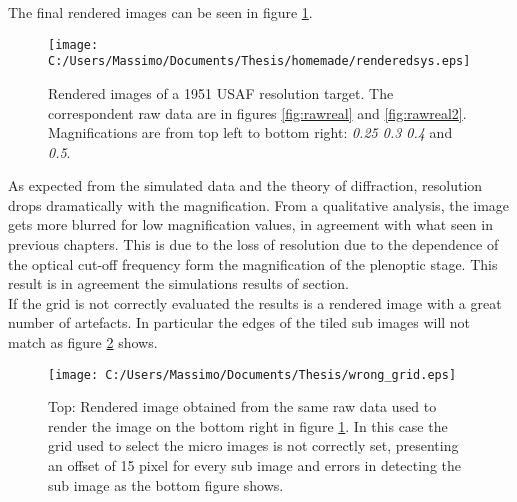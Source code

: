 The final rendered images can be seen in figure \ref{fig:renderingreal1}.
\\
\begin{figure}[H]
	\centering
	\texttt{[image: C:/Users/Massimo/Documents/Thesis/homemade/renderedsys.eps]}
	\caption{\label{fig:renderingreal1}Rendered images of a 1951 USAF resolution target. The correspondent raw data are in figures \ref{fig:rawreal} and \ref{fig:rawreal2}. Magnifications are from top left to bottom right: \textit{0.25 0.3 0.4} and \textit{0.5}. }
\end{figure}
As expected from the simulated data and the theory of diffraction, resolution drops dramatically with the magnification. From a qualitative analysis, the image gets more blurred for low magnification values, in agreement with what seen in previous chapters. This is due to the loss of resolution due to the dependence of the optical cut-off frequency form the magnification of the plenoptic stage. This result is in agreement the simulations results of section. \\
If the grid is not correctly evaluated the results is a rendered image with a great number of artefacts. In particular the edges of the tiled sub images will not match as figure \ref{fig:renderinwrong1} shows.
\begin{figure}[H]
	\centering
	\texttt{[image: C:/Users/Massimo/Documents/Thesis/wrong\_grid.eps]}
	\caption{\label{fig:renderinwrong1} Top: Rendered image obtained from the same raw data used to render the image on the bottom right in figure \ref{fig:renderingreal1}. In this case the grid used to select the micro images is not correctly set, presenting an offset of 15 pixel for every sub image and errors in detecting the sub image as the bottom figure shows.}
\end{figure}
